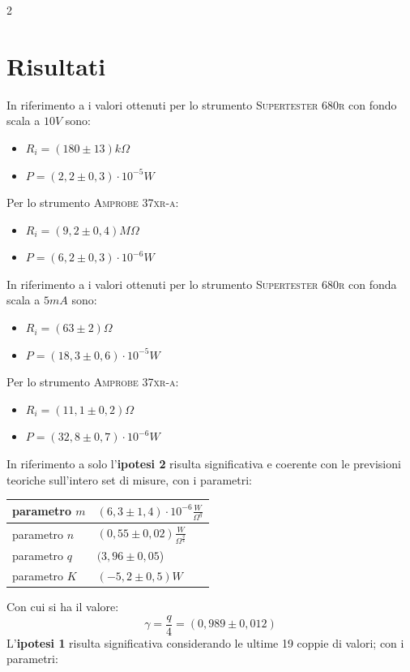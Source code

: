 \documentclass{article}
\begin{document}
\begin{multicols}{2}
\section{Risultati}
In riferimento a  i valori ottenuti per lo strumento \textsc{Supertester 680r} con fondo scala a \(10V\) sono:
\begin{itemize}
    \item \(R_i=(180 \pm 13) k\Omega\)
    \item \(P=(2,2 \pm 0,3)\cdot 10^{-5}W\)
\end{itemize}
Per lo strumento \textsc{Amprobe 37xr-a}:
\begin{itemize}
    \item \(R_i=(9,2 \pm 0,4) M\Omega\)
    \item \(P=(6,2 \pm 0,3)\cdot 10^{-6}W\)
\end{itemize}
In riferimento a  i valori ottenuti per lo strumento \textsc{Supertester 680r} con fonda scala a \(5mA\) sono:
\begin{itemize}
    \item \(R_i=(63 \pm 2) \Omega\)
    \item \(P=(18,3 \pm 0,6)\cdot 10^{-5}W\)
\end{itemize}
Per lo strumento \textsc{Amprobe 37xr-a}:
\begin{itemize}
    \item \(R_i=(11,1 \pm 0,2) \Omega\)
    \item \(P=(32,8 \pm 0,7)\cdot 10^{-6}W\)
\end{itemize}
In riferimento a  solo l'\textbf{ipotesi 2} risulta significativa  e coerente con le previsioni teoriche sull'intero set di misure, con i parametri:
\begin{center}
\begin{tabular}{|l|l|}
\hline
parametro  \(m\) & \((6,3\pm1,4) \cdot 10^{-6}\frac{W}{\Omega^q}\) \\ \hline
parametro \(n\)  & \((0,55\pm0,02) \frac{W}{\Omega^{\frac{q}{4}}}\)          \\ \hline
parametro \(q\)  & \((3,96\pm0,05\))                             \\ \hline
parametro \(K\)  & \((-5,2\pm0,5)W\)                           \\ \hline
\end{tabular}
\end{center}
Con cui si ha il valore:
\[\gamma=\frac{q}{4}=(0,989\pm 0,012)\]
\noindent
L'\textbf{ipotesi 1} risulta significativa considerando le ultime 19 coppie di valori; con i parametri:

\end{multicols}
\end{document}
